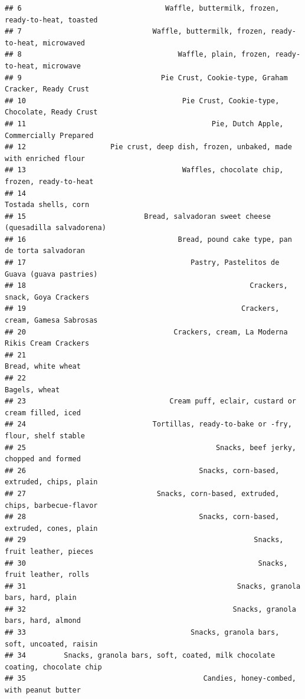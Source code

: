 \documentclass[
]{article}
\begin{document}
\begin{verbatim}
## 6                                  Waffle, buttermilk, frozen, ready-to-heat, toasted
## 7                               Waffle, buttermilk, frozen, ready-to-heat, microwaved
## 8                                     Waffle, plain, frozen, ready-to-heat, microwave
## 9                                 Pie Crust, Cookie-type, Graham Cracker, Ready Crust
## 10                                     Pie Crust, Cookie-type, Chocolate, Ready Crust
## 11                                            Pie, Dutch Apple, Commercially Prepared
## 12                    Pie crust, deep dish, frozen, unbaked, made with enriched flour
## 13                                     Waffles, chocolate chip, frozen, ready-to-heat
## 14                                                               Tostada shells, corn
## 15                            Bread, salvadoran sweet cheese (quesadilla salvadorena)
## 16                                    Bread, pound cake type, pan de torta salvadoran
## 17                                       Pastry, Pastelitos de Guava (guava pastries)
## 18                                                     Crackers, snack, Goya Crackers
## 19                                                   Crackers, cream, Gamesa Sabrosas
## 20                                   Crackers, cream, La Moderna Rikis Cream Crackers
## 21                                                                 Bread, white wheat
## 22                                                                      Bagels, wheat
## 23                                  Cream puff, eclair, custard or cream filled, iced
## 24                              Tortillas, ready-to-bake or -fry, flour, shelf stable
## 25                                             Snacks, beef jerky, chopped and formed
## 26                                         Snacks, corn-based, extruded, chips, plain
## 27                               Snacks, corn-based, extruded, chips, barbecue-flavor
## 28                                         Snacks, corn-based, extruded, cones, plain
## 29                                                      Snacks, fruit leather, pieces
## 30                                                       Snacks, fruit leather, rolls
## 31                                                  Snacks, granola bars, hard, plain
## 32                                                 Snacks, granola bars, hard, almond
## 33                                       Snacks, granola bars, soft, uncoated, raisin
## 34         Snacks, granola bars, soft, coated, milk chocolate coating, chocolate chip
## 35                                          Candies, honey-combed, with peanut butter

\end{verbatim}
\end{document}
